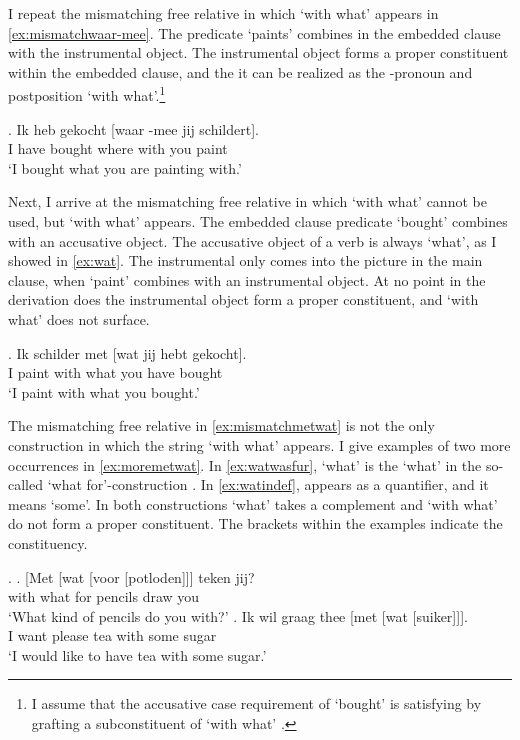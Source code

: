 \documentclass[12pt]{article}
\begin{document}
I repeat the mismatching free relative in which  `with what' appears in \ref{ex:mismatchwaar-mee}. The predicate  `paints' combines in the embedded clause with the instrumental object. The instrumental object forms a proper constituent within the embedded clause, and the it can be realized as the -pronoun and postposition  `with what'.\footnote{I assume that the accusative case requirement of  `bought' is satisfying by grafting a subconstituent of  `with what' \citep{bergsma2019}.}

\exg. Ik heb gekocht [waar -mee jij schildert].\\
 I have bought where with you paint\\
 `I bought what you are painting with.'\label{ex:mismatchwaar-mee}

Next, I arrive at the mismatching free relative in which  `with what' cannot be used, but  `with what' appears. The embedded clause predicate  `bought' combines with an accusative object. The accusative object of a verb is always  `what', as I showed in \ref{ex:wat}. The instrumental only comes into the picture in the main clause, when  `paint' combines with an instrumental object. At no point in the derivation does the instrumental object form a proper constituent, and  `with what' does not surface.

\exg. Ik schilder met [wat jij hebt gekocht].\\
 I paint with what you have bought\\
 `I paint with what you bought.'\label{ex:mismatchmetwat}

 The mismatching free relative in \ref{ex:mismatchmetwat} is not the only construction in which the string  `with what' appears. I give examples of two more occurrences in \ref{ex:moremetwat}. In \ref{ex:watwasfur},  `what' is the  `what' in the so-called  `what for'-construction \citep[cf.][]{corver1991}.
 In \ref{ex:watindef},  appears as a quantifier, and it means `some'. In both constructions  `what' takes a complement and  `with what' do not form a proper constituent. The brackets within the examples indicate the constituency.

 \ex.\label{ex:moremetwat}
 \ag. [Met [wat [voor [potloden]]] teken jij?\\
  with what for pencils draw you\\
  `What kind of pencils do you with?'\label{ex:watwasfur}
 \bg. Ik wil graag thee [met [wat [suiker]]].\\
  I want please tea with some sugar\\
  `I would like to have tea with some sugar.'\label{ex:watindef}
\end{document}
